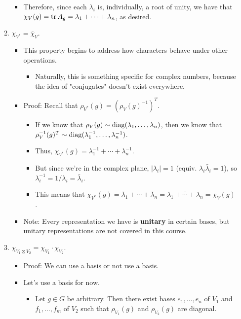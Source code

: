 \documentclass[../notes.tex]{subfiles}
\begin{document}
\begin{itemize}
\begin{enumerate}[resume]
\begin{itemize}
            \item Therefore, since each $\lambda_i$ is, individually, a root of unity, we have that $\chi_V(g)=\tr A_g=\lambda_1+\cdots+\lambda_n$, as desired.
        \end{itemize}
        \item $\chi_{V^*}=\bar{\chi}_V$.
        \begin{itemize}
            \item This property begins to address how characters behave under other operations.
            \begin{itemize}
                \item Naturally, this is something specific for complex numbers, because the idea of "conjugates" doesn't exist everywhere.
            \end{itemize}
            \item Proof: Recall that $\rho_{V^*}(g)=(\rho_V(g)^{-1})^T$.
            \begin{itemize}
                \item If we know that $\rho_V(g)\sim\operatorname{diag}(\lambda_1,\dots,\lambda_n)$, then we know that $\rho_V^{-1}(g)^T\sim\operatorname{diag}(\lambda_1^{-1},\dots,\lambda_n^{-1})$.
                \item Thus, $\chi_{V^*}(g)=\lambda_1^{-1}+\cdots+\lambda_n^{-1}$.
                \item But since we're in the complex plane, $|\lambda_i|=1$ (equiv. $\lambda_i\bar{\lambda}_i=1$), so $\lambda_i^{-1}=1/\lambda_i=\bar{\lambda}_i$.
                \item This means that $\chi_{V^*}(g)=\bar{\lambda}_1+\cdots+\bar{\lambda}_n=\overline{\lambda_1+\cdots+\lambda_n}=\bar{\chi}_V(g)$.
            \end{itemize}
            \item Note: Every representation we have is \textbf{unitary} in certain bases, but unitary representations are not covered in this course.
        \end{itemize}
        \item $\chi_{V_1\otimes V_2}=\chi_{V_1}\cdot\chi_{V_2}$.
        \begin{itemize}
            \item Proof: We can use a basis or not use a basis.
            \item Let's use a basis for now.
            \begin{itemize}
                \item Let $g\in G$ be arbitrary. Then there exist bases $e_1,\dots,e_n$ of $V_1$ and $f_1,\dots,f_m$ of $V_2$ such that $\rho_{V_1}(g)$ and $\rho_{V_2}(g)$ are diagonal.

\end{itemize}
\end{itemize}
\end{enumerate}
\end{itemize}
\end{document}
